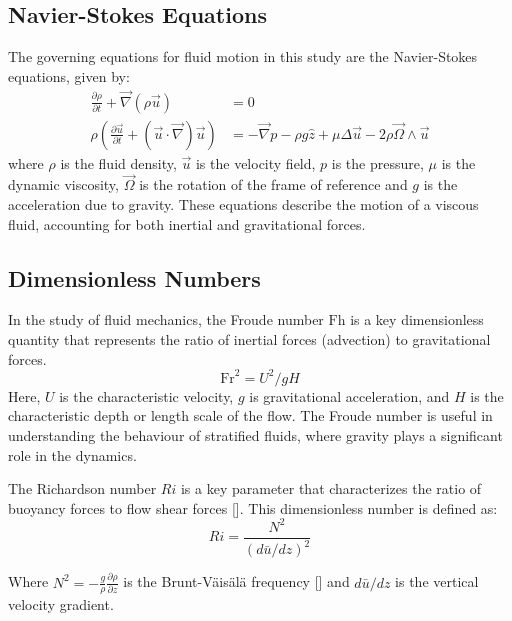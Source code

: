\documentclass[final,5p,times,twocolumn,authoryear]{elsarticle}
\newcommand{\pd}[2]{\frac{\partial #1}{\partial #2}}
\begin{document}
\subsection{Navier-Stokes Equations}

The governing equations for fluid motion in this study are the Navier-Stokes equations, given by:
\begin{subequations}
\begin{align}
\pd{\rho}{t} + \vec{\nabla} \left( \rho \vec{u} \right) &= 0 \\
\rho \left( \pd{\vec{u}}{t} + \left( \vec{u} \cdot \vec{\nabla} \right) \vec{u} \right) &= - \vec{\nabla} p - \rho g \hat{z} + \mu \Delta \vec{u} - 2 \rho \vec{\Omega} \wedge \vec{u}
\end{align}
\label{eq:NS}
\end{subequations}
where $\rho$ is the fluid density, $\vec{u}$ is the velocity field, $p$ is the pressure, $\mu$ is the dynamic viscosity, $\vec{\Omega}$ is the rotation of the frame of reference and $g$ is the acceleration due to gravity. These equations describe the motion of a viscous fluid, accounting for both inertial and gravitational forces.

\subsection{Dimensionless Numbers}

In the study of fluid mechanics, the Froude number $\mathrm{Fh}$ is a key dimensionless quantity that represents the ratio of inertial forces (advection) to gravitational forces.
\begin{equation*}
	\mathrm{Fr}^2 = U^2 / gH
\end{equation*} 
Here, $U$ is the characteristic velocity, $g$ is gravitational acceleration, and $H$ is the characteristic depth or length scale of the flow. The Froude number is useful in understanding the behaviour of stratified fluids, where gravity plays a significant role in the dynamics.

The Richardson number $Ri$ is a key parameter that characterizes the ratio of buoyancy forces to flow shear forces [\cite{cushman-roisin_introduction_2011}]. This dimensionless number is defined as:
\begin{equation}
Ri = \frac{N^2}{\left(d \bar{u} / dz \right)^2}
\end{equation}

Where $N^2 = -\frac{g}{\rho} \pd{\rho}{z}$ is the Brunt-Väisälä frequency [\cite{pedlosky_geophysical_1979}] and $d \bar{u} / dz$ is the vertical velocity gradient.
\end{document}
